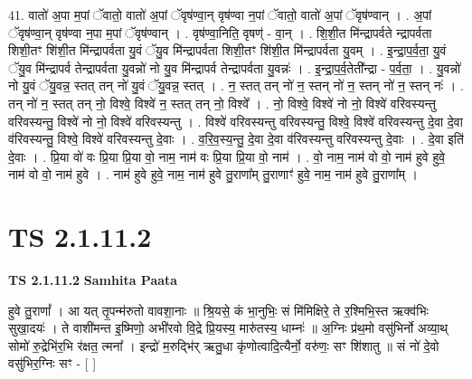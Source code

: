 \documentclass[17pt]{extarticle}
\begin{document}
41. वातो॑ अ॒पा म॒पां ॅवातो॒ वातो॑ अ॒पां ॅवृष॑ण्वा॒न् वृष॑ण्वा न॒पां ॅवातो॒ वातो॑ अ॒पां ॅवृष॑ण्वान् । . अ॒पां ॅवृष॑ण्वा॒न् वृष॑ण्वा न॒पा म॒पां ॅवृष॑ण्वान् । . वृष॑ण्वा॒निति॒ वृषण्॑ - वा॒न् । . शि॒शी॒त मि॑न्द्रापर्वते न्द्रापर्वता शिशी॒तꣳ शि॑शी॒त मि॑न्द्रापर्वता यु॒वं ॅयु॒व मि॑न्द्रापर्वता शिशी॒तꣳ शि॑शी॒त मि॑न्द्रापर्वता यु॒वम् । . इ॒न्द्रा॒प॒र्व॒ता॒ यु॒वं ॅयु॒व मि॑न्द्रापर्व तेन्द्रापर्वता यु॒वन्नो॑ नो यु॒व मि॑न्द्रापर्व तेन्द्रापर्वता यु॒वन्नः॑ । . इ॒न्द्रा॒प॒र्व॒तेती᳚न्द्रा - प॒र्व॒ता॒ । . यु॒वन्नो॑ नो यु॒वं ॅयु॒वन्न॒ स्तत् तन् नो॑ यु॒वं ॅयु॒वन्न॒ स्तत् । . न॒ स्तत् तन् नो॑ न॒ स्तन् नो॑ न॒ स्तन् नो॑ न॒ स्तन् नः॑ । . तन् नो॑ न॒ स्तत् तन् नो॒ विश्वे॒ विश्वे॑ न॒ स्तत् तन् नो॒ विश्वे᳚ । . नो॒ विश्वे॒ विश्वे॑ नो नो॒ विश्वे॑ वरिवस्यन्तु वरिवस्यन्तु॒ विश्वे॑ नो नो॒ विश्वे॑ वरिवस्यन्तु । . विश्वे॑ वरिवस्यन्तु वरिवस्यन्तु॒ विश्वे॒ विश्वे॑ वरिवस्यन्तु दे॒वा दे॒वा व॑रिवस्यन्तु॒ विश्वे॒ विश्वे॑ वरिवस्यन्तु दे॒वाः । . व॒रि॒व॒स्य॒न्तु॒ दे॒वा दे॒वा व॑रिवस्यन्तु वरिवस्यन्तु दे॒वाः । . दे॒वा इति॑ दे॒वाः । . प्रि॒या वो॑ वः प्रि॒या प्रि॒या वो॒ नाम॒ नाम॑ वः प्रि॒या प्रि॒या वो॒ नाम॑ । . वो॒ नाम॒ नाम॑ वो वो॒ नाम॑ हुवे हुवे॒ नाम॑ वो वो॒ नाम॑ हुवे । . नाम॑ हुवे हुवे॒ नाम॒ नाम॑ हुवे तु॒राणा᳚म् तु॒राणाꣳ॑ हुवे॒ नाम॒ नाम॑ हुवे तु॒राणा᳚म् । \newline
\pagebreak
{}
\section*{ TS 2.1.11.2 }

\textbf{TS 2.1.11.2 } \newline
\textbf{Samhita Paata} \newline

हुवे तु॒राणां᳚ । आ यत् तृ॒पन्म॑रुतो वावशा॒नाः ॥ श्रि॒यसे॒ कं भा॒नुभिः॒ सं मि॑मिक्षिरे॒ ते र॒श्मिभि॒स्त ऋक्व॑भिः सुखा॒दयः॑ । ते वाशी॑मन्त इ॒ष्मिणो॒ अभी॑रवो वि॒द्रे प्रि॒यस्य॒ मारु॑तस्य॒ धाम्नः॑ ॥ अ॒ग्निः प्र॑थ॒मो वसु॑भिर्नो अव्या॒थ् सोमो॑ रु॒द्रेभि॑र॒भि र॑क्षत॒ त्मना᳚ । इन्द्रो॑ म॒रुद्भि॑र् ऋतु॒धा कृ॑णोत्वादि॒त्यैर्नो॒ वरु॑णः॒ सꣳ शि॑शातु ॥ सं नो॑ दे॒वो वसु॑भिर॒ग्निः सꣳ - [  ] \newline
\end{document}
